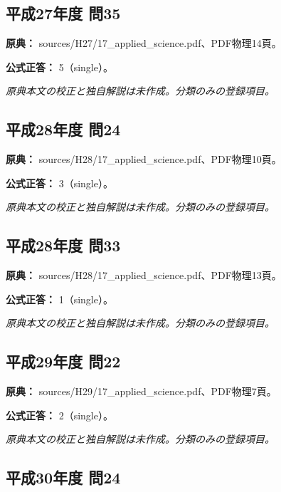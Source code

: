\subsection{平成27年度 問35}
\label{q:h27-reg-applied-35}

\noindent\textbf{原典：} sources/H27/17\_applied\_science.pdf、PDF物理14頁。

\textbf{公式正答：} 5（single）。

\par\textit{原典本文の校正と独自解説は未作成。分類のみの登録項目。}

\subsection{平成28年度 問24}
\label{q:h28-reg-applied-24}

\noindent\textbf{原典：} sources/H28/17\_applied\_science.pdf、PDF物理10頁。

\textbf{公式正答：} 3（single）。

\par\textit{原典本文の校正と独自解説は未作成。分類のみの登録項目。}

\subsection{平成28年度 問33}
\label{q:h28-reg-applied-33}

\noindent\textbf{原典：} sources/H28/17\_applied\_science.pdf、PDF物理13頁。

\textbf{公式正答：} 1（single）。

\par\textit{原典本文の校正と独自解説は未作成。分類のみの登録項目。}

\subsection{平成29年度 問22}
\label{q:h29-reg-applied-22}

\noindent\textbf{原典：} sources/H29/17\_applied\_science.pdf、PDF物理7頁。

\textbf{公式正答：} 2（single）。

\par\textit{原典本文の校正と独自解説は未作成。分類のみの登録項目。}

\subsection{平成30年度 問24}
\label{q:h30-reg-applied-24}

